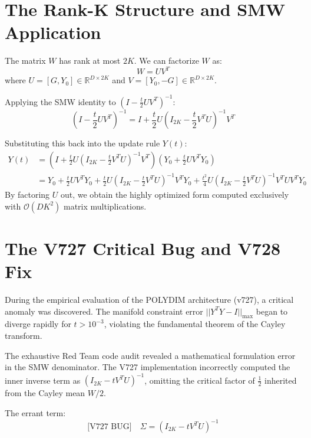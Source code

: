 \section{The Rank-K Structure and SMW Application}

The matrix $W$ has rank at most $2K$. We can factorize $W$ as:
\begin{equation}
W = U V^T
\end{equation}
where $U = [G, Y_0] \in \mathbb{R}^{D \times 2K}$ and $V = [Y_0, -G] \in \mathbb{R}^{D \times 2K}$.

Applying the SMW identity to $\left( I - \frac{t}{2} U V^T \right)^{-1}$:
\begin{equation}
\left( I - \frac{t}{2} U V^T \right)^{-1} = I + \frac{t}{2} U \left( I_{2K} - \frac{t}{2} V^T U \right)^{-1} V^T
\end{equation}

Substituting this back into the update rule $Y(t)$:
\begin{align*}
Y(t) &= \left( I + \frac{t}{2} U \left( I_{2K} - \frac{t}{2} V^T U \right)^{-1} V^T \right) \left( Y_0 + \frac{t}{2} U V^T Y_0 \right) \\
&= Y_0 + \frac{t}{2} U V^T Y_0 + \frac{t}{2} U \left( I_{2K} - \frac{t}{2} V^T U \right)^{-1} V^T Y_0 + \frac{t^2}{4} U \left( I_{2K} - \frac{t}{2} V^T U \right)^{-1} V^T U V^T Y_0
\end{align*}
By factoring $U$ out, we obtain the highly optimized form computed exclusively with $\mathcal{O}(DK^2)$ matrix multiplications.

\section{The V727 Critical Bug and V728 Fix}

During the empirical evaluation of the POLYDIM architecture (v727), a critical anomaly was discovered. The manifold constraint error $||Y^T Y - I||_{\max}$ began to diverge rapidly for $t > 10^{-3}$, violating the fundamental theorem of the Cayley transform. 

The exhaustive Red Team code audit revealed a mathematical formulation error in the SMW denominator. The V727 implementation incorrectly computed the inner inverse term as $(I_{2K} - t V^T U)^{-1}$, omitting the critical factor of $\frac{1}{2}$ inherited from the Cayley mean $W/2$.

The errant term:
\begin{equation*}
\text{[V727 BUG]} \quad \Sigma = \left( I_{2K} - t V^T U \right)^{-1}
\end{equation*}

